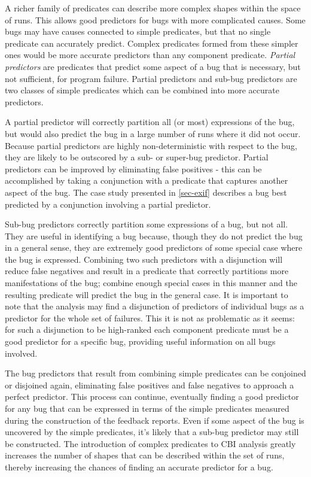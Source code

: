 A richer family of predicates can describe more complex shapes within the space of runs.  This allows good predictors for bugs with more complicated causes.  Some bugs may have causes connected to simple predicates, but that no single predicate can accurately predict.  Complex predicates formed from these simpler ones would be more accurate predictors than any component predicate.  \emph{Partial predictors} are predicates that predict some aspect of a bug that is necessary, but not sufficient, for program failure.  Partial predictors and sub-bug predictors are two classes of simple predicates which can be combined into more accurate predictors.

A partial predictor will correctly partition all (or most) expressions of the bug, but would also predict the bug in a large number of runs where it did not occur.  Because partial predictors are highly non-deterministic with respect to the bug, they are likely to be outscored by a sub- or super-bug predictor.  Partial predictors can be improved by eliminating false positives - this can be accomplished by taking a conjunction with a predicate that captures another aspect of the bug.  The case study presented in \autoref{sec-exif} describes a bug best predicted by a conjunction involving a partial predictor.

Sub-bug predictors correctly partition some expressions of a bug, but not all.  They are useful in identifying a bug because, though they do not predict the bug in a general sense, they are extremely good predictors of some special case where the bug is expressed.  Combining two such predictors with a disjunction will reduce false negatives and result in a predicate that correctly partitions more manifestations of the bug; combine enough special cases in this manner and the resulting predicate will predict the bug in the general case.  It is important to note that the analysis may find a disjunction of predictors of individual bugs as a predictor for the whole set of failures.  This it is not as problematic as it seems: for such a disjunction to be high-ranked each component predicate must be a good predictor for a specific bug, providing useful information on all bugs involved.

The bug predictors that result from combining simple predicates can be conjoined or disjoined again, eliminating false positives and false negatives to approach a perfect predictor.  This process can continue, eventually finding a good predictor for any bug that can be expressed in terms of the simple predicates measured during the construction of the feedback reports.  Even if some aspect of the bug is uncovered by the simple predicates, it's likely that a sub-bug predictor may still be constructed.  The introduction of complex predicates to CBI analysis greatly increases the number of shapes that can be described within the set of runs, thereby increasing the chances of finding an accurate predictor for a bug.

